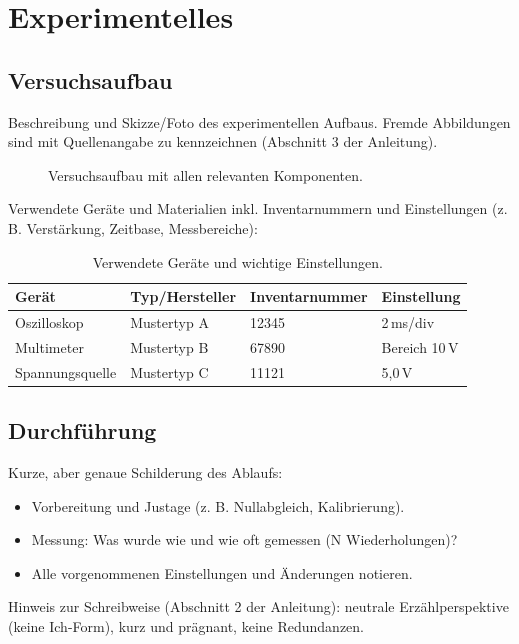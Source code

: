 \section{Experimentelles}
\label{sec:experimentelles}

\subsection{Versuchsaufbau}
Beschreibung und Skizze/Foto des experimentellen Aufbaus. Fremde
Abbildungen sind mit Quellenangabe zu kennzeichnen (Abschnitt 3 der
Anleitung).

\begin{figure}[H]
  \centering
  \caption{Versuchsaufbau mit allen relevanten Komponenten.}
  \label{fig:aufbau}
\end{figure}

Verwendete Geräte und Materialien inkl. Inventarnummern und
Einstellungen (z. B. Verstärkung, Zeitbase, Messbereiche):

\begin{table}[H]
  \centering
  \caption{Verwendete Geräte und wichtige Einstellungen.}
  \label{tab:geraete}
  \begin{tabular}{llll}
    \toprule
    Gerät & Typ/Hersteller & Inventarnummer & Einstellung \\
    \midrule
    Oszilloskop & Mustertyp A & 12345 & 2\,ms/div \\
    Multimeter & Mustertyp B & 67890 & Bereich 10\,V \\
    Spannungsquelle & Mustertyp C & 11121 & 5,0\,V \\
    \bottomrule
  \end{tabular}
\end{table}

\subsection{Durchführung}
Kurze, aber genaue Schilderung des Ablaufs:
\begin{itemize}
  \item Vorbereitung und Justage (z. B. Nullabgleich, Kalibrierung).
  \item Messung: Was wurde wie und wie oft gemessen (N Wiederholungen)?
  \item Alle vorgenommenen Einstellungen und Änderungen notieren.
\end{itemize}

Hinweis zur Schreibweise (Abschnitt 2 der Anleitung): neutrale
Erzählperspektive (keine Ich-Form), kurz und prägnant, keine Redundanzen.
